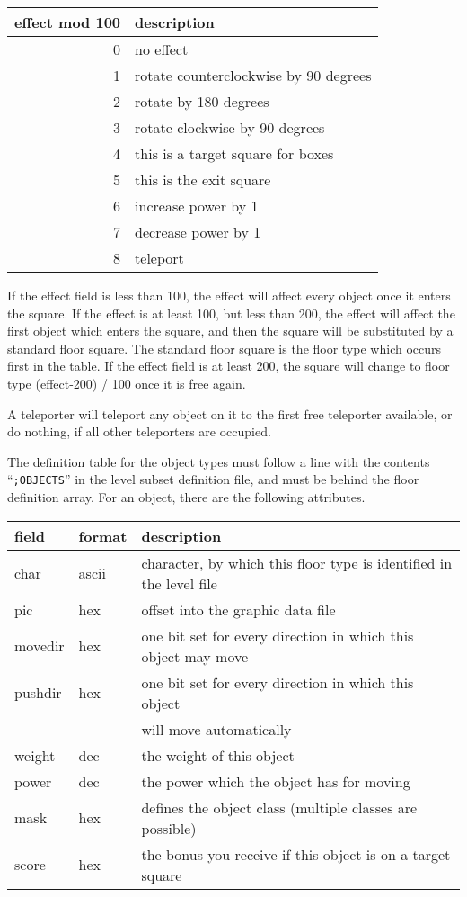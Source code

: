 \begin{center}
\begin{tabular}{|r|l|}
\hline
effect mod 100 & description\\
\hline
0 & no effect \\
1 & rotate counterclockwise by 90 degrees\\
2 & rotate by 180 degrees\\
3 & rotate clockwise by 90 degrees\\
4 & this is a target square for boxes\\
5 & this is the exit square\\
6 & increase power by 1\\
7 & decrease power by 1\\
8 & teleport\\
\hline
\end{tabular}
\end{center}

If the effect field is less than 100, the effect will affect every object once
it enters the square. If the effect is at least 100, but less than 200, the
effect will affect the first object which enters the square, and then the
square
will be substituted by a standard floor square.
The standard floor square is the floor type which occurs first in the table.
If the effect field is at least 200, the square will change to floor type
(effect-200) / 100 once it is free again.

A teleporter will teleport any object on it to the first free teleporter
available,
or do nothing, if all other teleporters are occupied.


The definition table for the object types must follow a line with
the contents ``{\tt ;OBJECTS}'' in the level subset definition file,
and must be behind the floor definition array.
For an object, there are the following attributes.

\begin{center}
\begin{tabular}{|l|l|l|}
\hline
field & format & description\\
\hline
char    & ascii & character, by which this floor type is identified in the level file\\
pic     & hex & offset into the graphic data file\\
movedir & hex & one bit set for every direction in which this object may move\\
pushdir & hex & one bit set for every direction in which this object\\
&& will move automatically\\
weight  & dec & the weight of this object\\
power   & dec & the power which the object has for moving\\
mask    & hex & defines the object class (multiple classes are possible)\\
score   & hex & the bonus you receive if this object is on a target square\\
\hline
\end{tabular}
\end{center}

